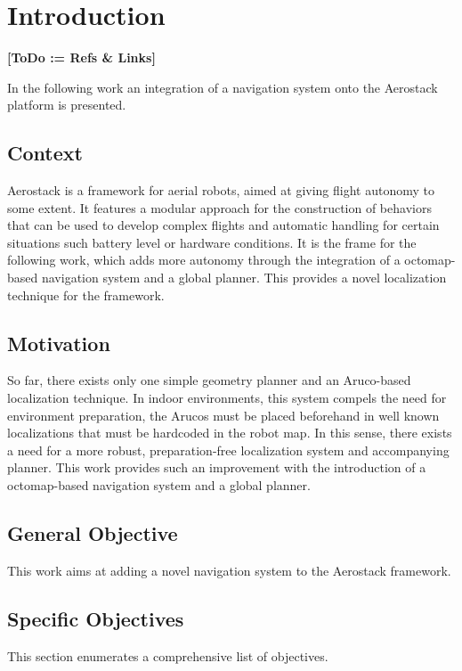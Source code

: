 \chapter{Introduction}

  \textbf{[ToDo := Refs \& Links]}

  In the following work an integration of a navigation system onto the Aerostack platform is presented.

  \section{Context}

    Aerostack is a framework for aerial robots, aimed at giving flight autonomy to some extent. It features a modular approach for the construction of behaviors that can be used to develop complex flights and automatic handling for certain situations such battery level or hardware conditions. It is the frame for the following work, which adds more autonomy through the integration of a octomap-based navigation system and a global planner. This provides a novel localization technique for the framework.

  \section{Motivation}

    So far, there exists only one simple geometry planner and an Aruco-based localization technique. In indoor environments, this system compels the need for environment preparation, the Arucos must be placed beforehand in well known localizations that must be hardcoded in the robot map. In this sense, there exists a need for a more robust, preparation-free localization system and accompanying planner. This work provides such an improvement with the introduction of a octomap-based navigation system and a global planner.

  \section{General Objective}

    This work aims at adding a novel navigation system to the Aerostack framework.


  \section{Specific Objectives}

    This section enumerates a comprehensive list of objectives.

